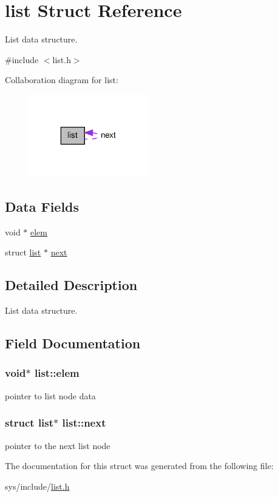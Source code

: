 \hypertarget{structlist}{\section{list Struct Reference}
\label{structlist}
}


List data structure.  




{\ttfamily \#include $<$list.\-h$>$}



Collaboration diagram for list\-:\nopagebreak
\begin{figure}[H]
\begin{center}
\leavevmode
\includegraphics[width=148pt]{structlist__coll__graph}
\end{center}
\end{figure}
\subsection*{Data Fields}
\begin{DoxyCompactItemize}
\item 
void $\ast$ \hyperlink{structlist_af3f79a2886a3f27cdfdfa202c2affc68}{elem}
\item 
struct \hyperlink{structlist}{list} $\ast$ \hyperlink{structlist_a1900fe79e875e2838625b2eb60837f8f}{next}
\end{DoxyCompactItemize}


\subsection{Detailed Description}
List data structure. 

\subsection{Field Documentation}
\hypertarget{structlist_af3f79a2886a3f27cdfdfa202c2affc68}{
\subsubsection[{elem}]{\setlength{\rightskip}{0pt plus 5cm}void$\ast$ list\-::elem}}\label{structlist_af3f79a2886a3f27cdfdfa202c2affc68}
pointer to list node data \hypertarget{structlist_a1900fe79e875e2838625b2eb60837f8f}{
\subsubsection[{next}]{\setlength{\rightskip}{0pt plus 5cm}struct {\bf list}$\ast$ list\-::next}}\label{structlist_a1900fe79e875e2838625b2eb60837f8f}
pointer to the next list node 

The documentation for this struct was generated from the following file\-:\begin{DoxyCompactItemize}
\item 
sys/include/\hyperlink{list_8h}{list.\-h}\end{DoxyCompactItemize}
